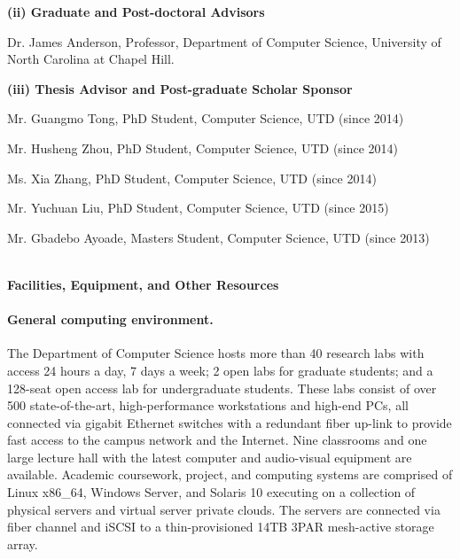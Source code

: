 \documentclass[10pt,letterpaper]{article}
\begin{document}
	\hspace{-4mm} \textbf{(ii) Graduate and Post-doctoral Advisors}\  
	\begin{changemargin}{8mm}{2mm}
	Dr. James Anderson, Professor, Department of Computer Science, University of North Carolina at Chapel Hill.
	\end{changemargin}
	
	\hspace{-4mm} \textbf{(iii) Thesis Advisor and Post-graduate Scholar Sponsor}\  
	\begin{changemargin}{8mm}{2mm}

	Mr. Guangmo Tong, PhD Student, Computer Science, UTD (since 2014)
		
	Mr. Husheng Zhou, PhD Student, Computer Science, UTD (since 2014)	
	
	Ms. Xia Zhang, PhD Student, Computer Science, UTD (since 2014)	
	
	Mr. Yuchuan Liu, PhD Student, Computer Science, UTD (since 2015)

	Mr. Gbadebo Ayoade, Masters Student, Computer Science, UTD (since 2013)	

	\end{changemargin}


\newpage


\newpage


\begin{center}
\Large{\textbf{\\Facilities, Equipment, and Other Resources}}
\end{center}

\paragraph{General computing environment.} The Department of Computer Science hosts more than 40 research labs with access 24 hours a day, 7 days a week; 2 open labs for graduate students; and a 128-seat open access lab for undergraduate students. These labs consist of over 500 state-of-the-art, high-performance workstations and high-end PCs, all connected via gigabit Ethernet switches with a redundant fiber up-link to provide fast access to the campus network and the Internet. Nine classrooms and one large lecture hall with the latest computer and audio-visual equipment are available. Academic coursework, project, and computing systems are comprised of Linux x86\_64, Windows Server, and Solaris 10 executing on a collection of physical servers and virtual server private clouds. The servers are connected via fiber channel and iSCSI to a thin-provisioned 14TB 3PAR mesh-active storage array. 
\end{document}
